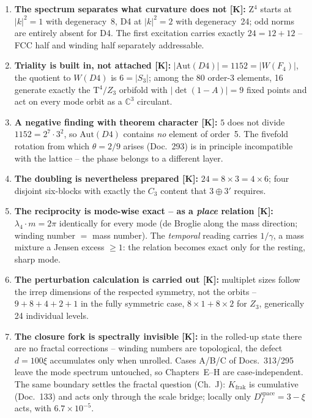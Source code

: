 \documentclass[11pt]{report}
\begin{document}
\begin{enumerate}
  \item \textbf{The spectrum separates what curvature does not
        [K]:} Z$^4$ starts at $|k|^2 = 1$ with degeneracy~8, D4 at
        $|k|^2 = 2$ with degeneracy~24; odd norms are entirely
        absent for D4. The first excitation carries exactly
        $24 = 12+12$ -- FCC half and winding half separately
        addressable.
  \item \textbf{Triality is built in, not attached [K]:}
        $|\text{Aut}(D4)| = 1152 = |W(F_4)|$, the quotient to
        $W(D4)$ is $6 = |S_3|$; among the 80 order-3 elements, 16
        generate exactly the T$^4/Z_3$ orbifold with
        $|\det(1-A)| = 9$ fixed points and act on every mode orbit
        as a $\mathbb{C}^3$ circulant.
  \item \textbf{A negative finding with theorem character [K]:} $5$
        does not divide $1152 = 2^7\cdot3^2$, so $\text{Aut}(D4)$
        contains \emph{no} element of order~5. The fivefold rotation
        from which $\theta = 2/9$ arises (Doc.~293) is in principle
        incompatible with the lattice -- the phase belongs to a
        different layer.
  \item \textbf{The doubling is nevertheless prepared [K]:}
        $24 = 8\times3 = 4\times6$; four disjoint six-blocks with
        exactly the $C_3$ content that $3\oplus3'$ requires.
  \item \textbf{The reciprocity is mode-wise exact -- as a
        \emph{place} relation [K]:} $\lambda_4\cdot m = 2\pi$
        identically for every mode (de Broglie along the mass
        direction; winding number $=$ mass number). The
        \emph{temporal} reading carries $1/\gamma$, a mass mixture
        a Jensen excess $\ge1$: the relation becomes exact only
        for the resting, sharp mode.
  \item \textbf{The perturbation calculation is carried out [K]:}
        multiplet sizes follow the irrep dimensions of the
        respected symmetry, not the orbits -- $9+8+4+2+1$ in the
        fully symmetric case, $8\times1+8\times2$ for $Z_3$,
        generically 24 individual levels.
  \item \textbf{The closure fork is spectrally invisible [K]:} in
        the rolled-up state there are no fractal corrections --
        winding numbers are topological, the defect $d = 100\xi$
        accumulates only when unrolled. Cases A/B/C of
        Docs.~313/295 leave the mode spectrum untouched, so
        Chapters~E--H are case-independent. The same boundary
        settles the fractal question (Ch.~J): $K_\text{frak}$ is
        cumulative (Doc.~133) and acts only through the scale
        bridge; locally only $D_f^\text{space} = 3-\xi$ acts, with
        $6.7\times10^{-5}$.
\end{enumerate}
\end{document}
